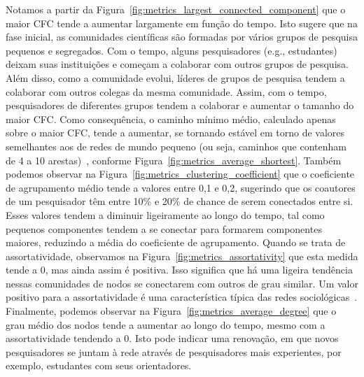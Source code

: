 
Notamos a partir da Figura~\ref{fig:metrics_largest_connected_component} que o maior CFC tende a aumentar largamente em função do 
tempo. Isto sugere que na fase inicial, as comunidades científicas são formadas por vários grupos de pesquisa pequenos 
e segregados. Com o tempo, alguns pesquisadores (e.g., estudantes) deixam suas instituições e começam a colaborar com outros 
grupos de pesquisa. Além disso, como a comunidade evolui, líderes de grupos de pesquisa tendem a colaborar com outros colegas 
da mesma comunidade. Assim, com o tempo, pesquisadores de diferentes grupos tendem a colaborar e aumentar o tamanho do maior 
CFC. Como consequência, o caminho mínimo médio, calculado apenas sobre o maior CFC, tende a aumentar, 
se tornando estável em torno de valores semelhantes aos de redes de mundo pequeno (ou seja, caminhos que contenham de 4 a 10 
arestas)~\citep{Mislove2007, Backstrom2012}, conforme Figura~\ref{fig:metrics_average_shortest}. 
Também podemos observar na Figura~\ref{fig:metrics_clustering_coefficient} que o coeficiente de agrupamento médio tende a valores 
entre 0,1 e 0,2, sugerindo que os coautores de um pesquisador têm entre 10\% e 20\% de chance de serem conectados entre 
si. Esses valores tendem a diminuir ligeiramente ao longo do tempo, tal como pequenos componentes tendem a se
conectar para formarem componentes maiores, reduzindo a média do coeficiente de agrupamento. Quando se trata de assortatividade, 
observamos na Figura~\ref{fig:metrics_assortativity} que esta medida tende a 0, mas ainda assim é positiva. Isso significa que 
há uma ligeira tendência nessas comunidades de nodos se conectarem com outros de grau similar. Um valor positivo para a
assortatividade é uma característica típica das redes sociológicas~\citep{Newman2003}. Finalmente, podemos observar na 
Figura~\ref{fig:metrics_average_degree} que o grau médio dos nodos tende a aumentar ao longo do tempo, mesmo com a assortatividade
tendendo a 0. Isto pode indicar uma renovação, em que novos pesquisadores se juntam à rede através de pesquisadores mais experientes,
por exemplo, estudantes com seus orientadores.

